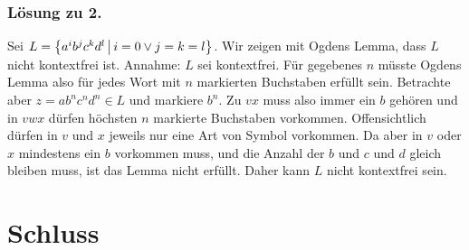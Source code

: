 \begin{frame}
\frametitle{Lösung zu 2.}
Sei $L = \left\lbrace a^ib^jc^kd^l \,\middle\vert\, i = 0 \vee j = k = l \right\rbrace$. Wir zeigen mit Ogdens Lemma, dass $L$ nicht kontextfrei ist. \micropause
Annahme: $L$ sei kontextfrei. Für gegebenes $n$ müsste Ogdens Lemma also für jedes Wort mit $n$ markierten Buchstaben erfüllt sein. \micropause
Betrachte aber $z = ab^nc^nd^n \in L$ und markiere $b^n$. \micropause
Zu $vx$ muss also immer ein $b$ gehören und in $vwx$ dürfen höchsten $n$ markierte Buchstaben vorkommen. Offensichtlich dürfen in $v$ und $x$ jeweils nur eine Art von Symbol vorkommen. Da aber in $v$ oder $x$ mindestens ein $b$ vorkommen muss, und die Anzahl der $b$ und $c$ und $d$ gleich bleiben muss, ist das Lemma nicht erfüllt. Daher kann $L$ nicht kontextfrei sein.
\end{frame}

\section{Schluss}
